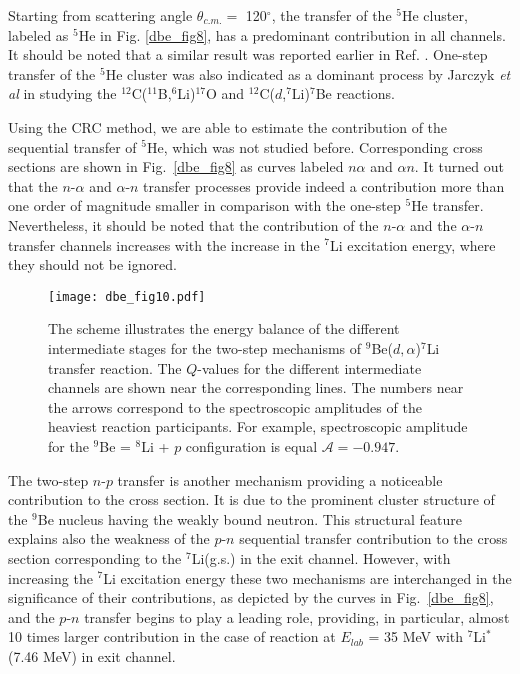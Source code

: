 \documentclass[
12pt, %
oneside, %
english, %
onehalfspacing, %
onehalfspacing, %
headsepline, %
]{MastersDoctoralThesis} %
\begin{document}
Starting from scattering angle $\theta_{c.m.} =$ 120$^\circ$, the transfer of the ${}^5$He cluster, labeled as ${}^5$He in Fig. \ref{dbe_fig8}, has a predominant contribution in all channels. It should be noted that a similar result was reported earlier in Ref. \cite{bodek1989}. One-step transfer of the ${}^5$He cluster was also indicated as a dominant process by Jarczyk \textit{et al} \cite{jarczyk1996} in studying the ${}^{12}$C(${}^{11}$B,${}^6$Li)${}^{17}$O and ${}^{12}$C($d$,${}^7$Li)${}^{7}$Be reactions.

Using the CRC method, we are able to estimate the contribution of the sequential transfer of ${}^5$He, which was not studied before. Corresponding cross sections are shown in Fig.~\ref{dbe_fig8} as curves labeled $n\alpha$ and $\alpha n$.
It turned out that the $n$-$\alpha$ and $\alpha$-$n$ transfer processes provide indeed a contribution more than one order of magnitude smaller in comparison with the one-step ${}^5$He transfer. Nevertheless, it should be noted that the contribution of the $n$-$\alpha$ and the $\alpha$-$n$ transfer channels increases with the increase in the ${}^7$Li excitation energy, where they should not be ignored.

\begin{figure}%
\centering
\texttt{[image: dbe\_fig10.pdf]}
\decoRule
\caption{\label{dbe_fig10} \footnotesize The scheme illustrates the energy balance of the different intermediate stages for the two-step mechanisms of ${}^9$Be($d,\alpha$)${}^7$Li transfer reaction. The $Q$-values for the different intermediate channels are shown near the corresponding lines. The numbers near the arrows correspond to the spectroscopic amplitudes of the heaviest reaction participants. For example, spectroscopic amplitude for the ${}^9$Be = ${}^8$Li + $p$ configuration is equal $\mathcal{A} = -0.947$.}
\end{figure}

The two-step $n$-$p$ transfer is another mechanism providing a noticeable contribution to the cross section. It is due to the prominent cluster structure of the ${}^9$Be nucleus having the weakly bound neutron. This structural feature explains also the weakness of the $p$-$n$ sequential transfer contribution to the cross section corresponding to the ${}^7$Li(g.s.) in the exit channel. However, with increasing the ${}^7$Li excitation energy these two mechanisms are interchanged in the significance of their contributions, as depicted by the curves in Fig.~\ref{dbe_fig8}, and the $p$-$n$ transfer begins to play a leading role, providing, in particular, almost 10 times larger contribution in the case of reaction at $E_{lab}$ = 35 MeV with ${}^7$Li$^*$(7.46 MeV) in exit channel.
\end{document}

